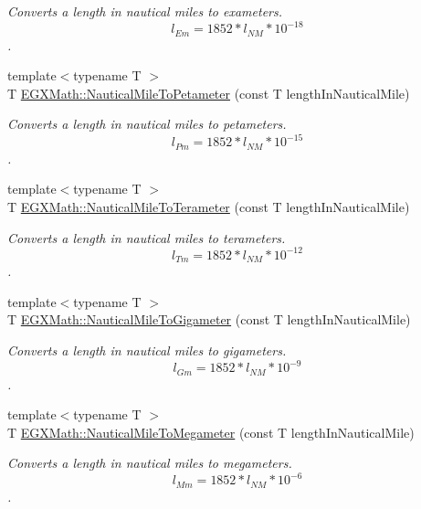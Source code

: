 \begin{DoxyCompactItemize}
\begin{DoxyCompactList}\small\item\em Converts a length in nautical miles to exameters. \[ l_{Em}=1852 * l_{NM} * 10^{-18} \]. \end{DoxyCompactList}\item 
{\footnotesize template$<$typename T $>$ }\\T \mbox{\hyperlink{group___e_g_x_math-_conversions-_length_conversions-_non-_s_i-_nautical_mile-_s_i_ga89c2423e9ccfe76f9a9137060ac23e8d}{E\+G\+X\+Math\+::\+Nautical\+Mile\+To\+Petameter}} (const T length\+In\+Nautical\+Mile)
\begin{DoxyCompactList}\small\item\em Converts a length in nautical miles to petameters. \[ l_{Pm}=1852 * l_{NM} * 10^{-15} \]. \end{DoxyCompactList}\item 
{\footnotesize template$<$typename T $>$ }\\T \mbox{\hyperlink{group___e_g_x_math-_conversions-_length_conversions-_non-_s_i-_nautical_mile-_s_i_gabd27057118659d507b698fc258ee5200}{E\+G\+X\+Math\+::\+Nautical\+Mile\+To\+Terameter}} (const T length\+In\+Nautical\+Mile)
\begin{DoxyCompactList}\small\item\em Converts a length in nautical miles to terameters. \[ l_{Tm}=1852 * l_{NM} * 10^{-12} \]. \end{DoxyCompactList}\item 
{\footnotesize template$<$typename T $>$ }\\T \mbox{\hyperlink{group___e_g_x_math-_conversions-_length_conversions-_non-_s_i-_nautical_mile-_s_i_ga88b5a7dada605b923f1855f3ea4d4dc0}{E\+G\+X\+Math\+::\+Nautical\+Mile\+To\+Gigameter}} (const T length\+In\+Nautical\+Mile)
\begin{DoxyCompactList}\small\item\em Converts a length in nautical miles to gigameters. \[ l_{Gm}=1852 * l_{NM} * 10^{-9} \]. \end{DoxyCompactList}\item 
{\footnotesize template$<$typename T $>$ }\\T \mbox{\hyperlink{group___e_g_x_math-_conversions-_length_conversions-_non-_s_i-_nautical_mile-_s_i_gabd190340a7a220633ebf73e06cba7e1a}{E\+G\+X\+Math\+::\+Nautical\+Mile\+To\+Megameter}} (const T length\+In\+Nautical\+Mile)
\begin{DoxyCompactList}\small\item\em Converts a length in nautical miles to megameters. \[ l_{Mm}=1852 * l_{NM} * 10^{-6} \]. \end{DoxyCompactList}\item 

\end{DoxyCompactItemize}
